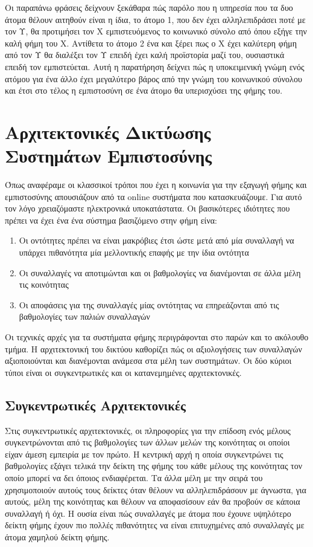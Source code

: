 Οι παραπάνω φράσεις δείχνουν ξεκάθαρα πώς παρόλο που η υπηρεσία που τα δυο άτομα θέλουν αιτηθούν είναι η ίδια, το άτομο 1, που δεν έχει αλληλεπιδράσει ποτέ με τον Υ, θα προτιμήσει τον Χ εμπιστευόμενος το κοινωνικό σύνολο από όπου εξήγε την καλή φήμη του Χ. Αντίθετα το άτομο 2 ένα και ξέρει πως ο Χ έχει καλύτερη φήμη από τον Υ θα διαλέξει τον Υ επειδή έχει καλή προϊστορία μαζί του, ουσιαστικά επειδή τον εμπιστεύεται. Αυτή η παρατήρηση δείχνει πώς η υποκειμενική γνώμη ενός ατόμου για ένα άλλο έχει μεγαλύτερο βάρος από την γνώμη του κοινωνικού σύνολου και έτσι στο τέλος η εμπιστοσύνη σε ένα άτομο θα υπερισχύσει της φήμης του.

\section{Αρχιτεκτονικές Δικτύωσης Συστημάτων Εμπιστοσύνης}

Όπως αναφέραμε οι κλασσικοί τρόποι που έχει η κοινωνία για την εξαγωγή φήμης και εμπιστοσύνης απουσιάζουν από τα online συστήματα που κατασκευάζουμε. Για αυτό τον λόγο χρειαζόμαστε ηλεκτρονικά υποκατάστατα. Οι βασικότερες ιδιότητες που πρέπει να έχει ένα ένα σύστημα βασιζόμενο στην φήμη είνα: %

\begin{enumerate}
\item Οι οντότητες πρέπει να είναι μακρόβιες έτσι ώστε μετά από μία συναλλαγή να υπάρχει πιθανότητα μία μελλοντικής επαφής με την ίδια οντότητα

\item Οι συναλλαγές να αποτιμώνται και οι βαθμολογίες να διανέμονται σε άλλα μέλη τις κοινότητας

\item Οι αποφάσεις για της συναλλαγές μίας οντότητας να επηρεάζονται από τις βαθμολογίες των παλιών συναλλαγών
\end{enumerate}

Οι τεχνικές αρχές για τα συστήματα φήμης περιγράφονται στο παρών και το ακόλουθο τμήμα. Η αρχιτεκτονική του δικτύου καθορίζει πώς οι αξιολογήσεις των συναλλαγών αξιοποιούνται και διανέμονται ανάμεσα στα μέλη των συστημάτων. Οι δύο κύριοι τύποι είναι οι συγκεντρωτικές και οι κατανεμημένες αρχιτεκτονικές.%
\subsection{Συγκεντρωτικές Αρχιτεκτονικές}\label{sec:centralized}

Στις συγκεντρωτικές αρχιτεκτονικές, οι πληροφορίες για την επίδοση ενός μέλους συγκεντρώνονται από τις βαθμολογίες των άλλων μελών της κοινότητας οι οποίοι είχαν άμεση εμπειρία με τον πρώτο. Η κεντρική αρχή η οποία συγκεντρώνει τις βαθμολογίες εξάγει τελικά την δείκτη της φήμης του κάθε μέλους της κοινότητας τον οποίο μπορεί να δει όποιος ενδιαφέρεται. Τα άλλα μέλη με την σειρά του χρησιμοποιούν αυτούς τους δείκτες όταν θέλουν να αλληλεπιδράσουν με άγνωστα, για αυτούς, μέλη της κοινότητας και θέλουν να αποφασίσουν εάν θα προβούν σε κάποια συναλλαγή ή όχι. Η ουσία είναι πώς συναλλαγές με άτομα που έχουνε υψηλότερο δείκτη φήμης έχουν πιο πολλές πιθανότητες να είναι επιτυχημένες από συναλλαγές με άτομα χαμηλού δείκτη φήμης.

